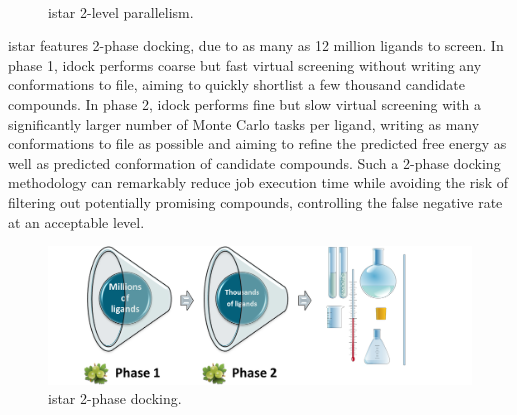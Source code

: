 \begin{figure}
\centering
{}
\\
\caption{istar 2-level parallelism.}
\label{istar:2LevelParallelism}
\end{figure}

istar features 2-phase docking, due to as many as 12 million ligands to screen. In phase 1, idock performs coarse but fast virtual screening without writing any conformations to file, aiming to quickly shortlist a few thousand candidate compounds. In phase 2, idock performs fine but slow virtual screening with a significantly larger number of Monte Carlo tasks per ligand, writing as many conformations to file as possible and aiming to refine the predicted free energy as well as predicted conformation of candidate compounds. Such a 2-phase docking methodology can remarkably reduce job execution time while avoiding the risk of filtering out potentially promising compounds, controlling the false negative rate at an acceptable level.

\begin{figure}
\centering
\includegraphics[width=\linewidth]{istar/2PhaseDocking.png}
\caption{istar 2-phase docking.}
\label{istar:2PhaseDocking}
\end{figure}

